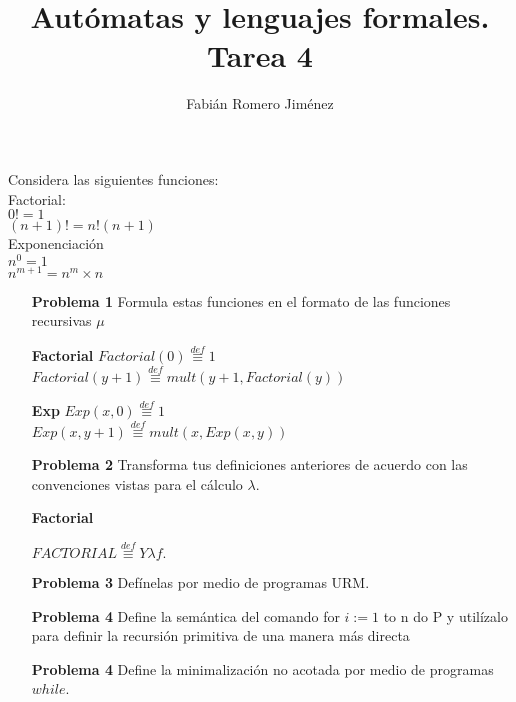 \documentclass{article}
\title{Autómatas y lenguajes formales. Tarea 4}
\author{Fabián Romero Jiménez}
\begin{document}
\maketitle
Considera las siguientes funciones:\\
Factorial: \\
$0! = 1$ \\
$(n + 1)! = n!  (n + 1)$ \\
Exponenciación \\
$n^0=1$ \\
$n^{m+1}=n^m \times n$ \\

\begin{enumerate}
\item[\bf{Problema 1}] Formula estas funciones en el formato de las  
funciones recursivas $\mu$ 

\item[\bf{Factorial}]
$Factorial(0)  \stackrel{def}{\equiv} 1$\\
$Factorial(y+1) \stackrel{def}{\equiv} mult(y+1,Factorial(y))$

\item[\bf{Exp}]
$Exp(x,0)  \stackrel{def}{\equiv} 1$\\
$Exp(x,y+1) \stackrel{def}{\equiv} mult(x,Exp(x,y))$

\item[\bf{Problema 2}] Transforma tus definiciones anteriores de acuerdo con las convenciones vistas para el cálculo $\lambda$.

\item[\bf{Factorial}]


$FACTORIAL \stackrel{def}{\equiv} Y\lambda f.$
\item[\bf{Problema 3}] Defínelas por medio de programas URM.

\item[\bf{Problema 4}]Define la semántica del comando
for $i := 1$ to n do P
y utilízalo para definir la recursión primitiva de una manera más directa

\item[\bf{Problema 4}] Define la minimalización no acotada por medio de programas $while$.

\end{enumerate}
\end{document}
